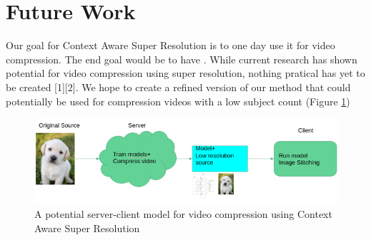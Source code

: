 \section{Future Work}

Our goal for Context Aware Super Resolution is to one day use it for video compression. The end goal would be to have . While current research has shown potential for video compression using super resolution, nothing pratical has yet to be created [1][2]. We hope to create a refined version of our method that could potentially be used for compression videos with a low subject count (Figure \ref{fig:compression})


\begin{figure}
    \centering
    \includegraphics[width=.45\textwidth]{images/compression.png}
    \caption{A potential server-client model for video compression using Context Aware Super Resolution}
    \label{fig:compression}
\end{figure}

